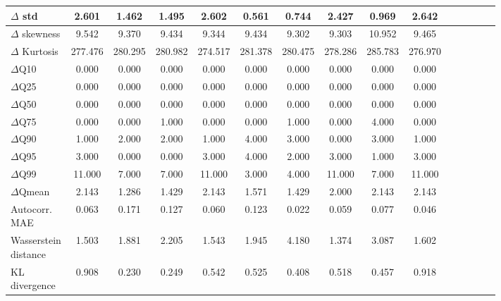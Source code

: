 \documentclass[make,article,submit,moreauthors]{Definitions/mdpi}
\begin{document}
\begin{table}[htbp]
\begin{tabular*}{\textwidth}{@{\extracolsep{\fill}}l|cccccccccccccc}
$\Delta$ std                        & 2.601   & 1.462   & 1.495   & 2.602   & 0.561   & 0.744   & 2.427    & 0.969   & 2.642           \\ \hline
$\Delta$ skewness                   & 9.542   & 9.370   & 9.434   & 9.344   & 9.434   & 9.302   & 9.303    & 10.952  & 9.465           \\ \hline
$\Delta$ Kurtosis                   & 277.476 & 280.295 & 280.982 & 274.517 & 281.378 & 280.475 & 278.286  & 285.783 & 276.970         \\ \hline
$\Delta$Q10                         & 0.000   & 0.000   & 0.000   & 0.000   & 0.000   & 0.000   & 0.000    & 0.000   & 0.000           \\ \hline
$\Delta$Q25                         & 0.000   & 0.000   & 0.000   & 0.000   & 0.000   & 0.000   & 0.000    & 0.000   & 0.000           \\ \hline
$\Delta$Q50                         & 0.000   & 0.000   & 0.000   & 0.000   & 0.000   & 0.000   & 0.000    & 0.000   & 0.000           \\ \hline
$\Delta$Q75                         & 0.000   & 0.000   & 1.000   & 0.000   & 0.000   & 1.000   & 0.000    & 4.000   & 0.000           \\ \hline
$\Delta$Q90                         & 1.000   & 2.000   & 2.000   & 1.000   & 4.000   & 3.000   & 0.000    & 3.000   & 1.000           \\ \hline
$\Delta$Q95                         & 3.000   & 0.000   & 0.000   & 3.000   & 4.000   & 2.000   & 3.000    & 1.000   & 3.000           \\ \hline
$\Delta$Q99                         & 11.000  & 7.000   & 7.000   & 11.000  & 3.000   & 4.000   & 11.000   & 7.000   & 11.000          \\ \hline
$\Delta$Qmean                       & 2.143   & 1.286   & 1.429   & 2.143   & 1.571   & 1.429   & 2.000    & 2.143   & 2.143           \\ \hline
\shortstack{Autocorr.\\MAE}         & 0.063   & 0.171   & 0.127   & 0.060   & 0.123   & 0.022   & 0.059    & 0.077   & 0.046           \\ \hline
\shortstack{Wasserstein\\distance}  & 1.503   & 1.881   & 2.205   & 1.543   & 1.945   & 4.180   & 1.374    & 3.087   & 1.602           \\ \hline
\shortstack{KL\\divergence}         & 0.908   & 0.230   & 0.249   & 0.542   & 0.525   & 0.408   & 0.518    & 0.457   & 0.918           \\ \hline

\end{tabular*}
\end{table}
\end{document}

